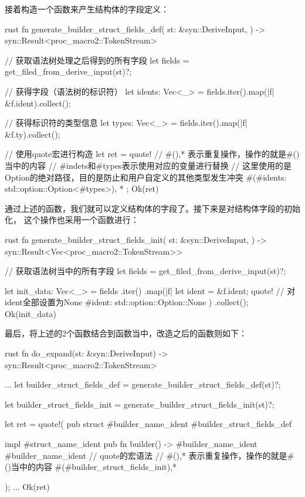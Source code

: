 接着构造一个函数来产生结构体的字段定义：
\begin{code-block}{rust}
fn generate_builder_struct_fields_def(
    st: &syn::DeriveInput,
) -> syn::Result<proc_macro2::TokenStream> {
    // 获取语法树处理之后得到的所有字段
    let fields = get_filed_from_derive_input(st)?;

    // 获得字段（语法树的标识符）
    let idents: Vec<_> = fields.iter().map(|f| &f.ident).collect();

    // 获得标识符的类型信息
    let types: Vec<_> = fields.iter().map(|f| &f.ty).collect();

    // 使用quote宏进行构造
    let ret = quote! {
        // #(),* 表示重复操作，操作的就是#()当中的内容
        // #indets和#types表示使用对应的变量进行替换
        // 这里使用的是Option的绝对路径，目的是防止和用户自定义的其他类型发生冲突
        #(#idents: std::option::Option<#types>), *
    };
    Ok(ret)
}
\end{code-block}
通过上述的函数，我们就可以定义结构体的字段了。接下来是对结构体字段的初始化，
这个操作也采用一个函数进行：
\begin{code-block}{rust}
fn generate_builder_struct_fields_init(
    st: &syn::DeriveInput,
) -> syn::Result<Vec<proc_macro2::TokenStream>> {
    // 获取语法树当中的所有字段
    let fields = get_filed_from_derive_input(st)?;

    let init_data: Vec<_> = fields
        .iter()
        .map(|f| {
            let ident = &f.ident;
            quote! {
                // 对ident全部设置为None
                #ident: std::option::Option::None
            }
        })
        .collect();
    Ok(init_data)
}
\end{code-block}

最后，将上述的2个函数结合到函数当中，改造之后的函数则如下：
\begin{code-block}{rust}
fn do_expand(st: &syn::DeriveInput) -> syn::Result<proc_macro2::TokenStream> {
    ...
    let builder_struct_fields_def = generate_builder_struct_fields_def(st)?;

    let builder_struct_fields_init = generate_builder_struct_fields_init(st)?;

    let ret = quote!(
        pub struct #builder_name_ident {
            #builder_struct_fields_def
        }

        impl #struct_name_ident {
            pub fn builder() -> #builder_name_ident {
                #builder_name_ident {
                    // quote的宏语法
                    // #(),* 表示重复操作，操作的就是#()当中的内容
                    #(#builder_struct_fields_init),*
                }
            }
        }

    );
    ...
    Ok(ret)
}
\end{code-block}

